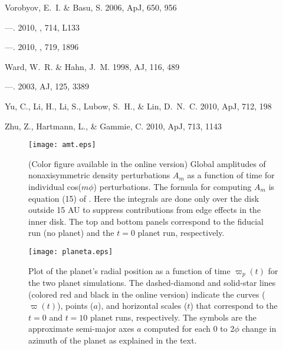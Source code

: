 \documentclass[12pt,manuscript,authoryear]{aastex}
\begin{document}
\begin{thebibliography}{48}
{Vorobyov}, E.~I. \& {Basu}, S. 2006, ApJ, 650, 956

---. 2010{}, \apjl, 714, L133

---. 2010{}, \apj, 719, 1896

{Ward}, W.~R. \& {Hahn}, J.~M. 1998, AJ, 116, 489

---. 2003, AJ, 125, 3389

{Yu}, C., {Li}, H., {Li}, S., {Lubow}, S.~H., \& {Lin}, D.~N.~C. 2010, ApJ,
  712, 198

{Zhu}, Z., {Hartmann}, L., \& {Gammie}, C. 2010, ApJ, 713, 1143

\end{thebibliography}

\newpage

\begin{figure}[t]
\center
\texttt{[image: amt.eps]}
\caption{(Color figure available in the online version) Global amplitudes of nonaxisymmetric density perturbations $A_m$
  as a function of time for individual cos($m\phi$) perturbations. The formula for computing $A_m$ is equation (15) of
  \citep{boley2006}. Here the integrals are done only over the disk outside 15 AU to suppress contributions from edge
  effects in the inner disk. The top and bottom panels correspond to the fiducial run (no planet) and the $t = 0$ planet
  run, respectively.}
\label{fig:Am}
\end{figure}

\begin{figure}[t]
\center
\texttt{[image: planeta.eps]}
\caption{Plot of the planet's radial position as a function of time $\varpi_p(t)$ for the two planet simulations. The
  dashed-diamond and solid-star lines (colored red and black in the online version) indicate the curves ($\varpi(t)$),
  points ($a$), and horizontal scales ($t$) that correspond to the $t = 0$ and $t = 10$ planet runs, respectively. The
  symbols are the approximate semi-major axes $a$ computed for each 0 to 2$\phi$ change in azimuth of the planet as
  explained in the text.}
\label{fig:a}
\end{figure}
\end{document}
